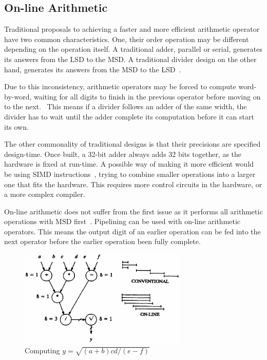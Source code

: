 \documentclass[journal]{IEEEtran}
\begin{document}
\subsection{On-line Arithmetic}
Traditional proposals to achieving a faster and more efficient arithmetic
operator have two common characteristics.
One, their order operation may be different depending on the operation itself.
A traditional adder, parallel or serial, generates its answers from the LSD to
the MSD.
A traditional divider design on the other hand, generates its answers from
the MSD to the LSD~\cite{Brent1}\cite{Srinivas1}.

Due to this inconsistency, arithmetic operators may be forced to compute
word-by-word, waiting for all digits to finish in the previous operator before
moving on to the next.~\cite{Zhao1}
This means if a divider follows an adder of the same width, the divider has to
wait until the adder complete its computation before it can start its own.

The other commonality of traditional designs is that their precisions are
specified design-time. Once built, a 32-bit adder always adds 32 bits together,
as the hardware is fixed at run-time.
A possible way of making it more efficient would be using SIMD
instructions~\cite{Duncan1}, trying to combine smaller operations into a larger
one that fits the hardware.
This requires more control circuits in the hardware, or a more complex compiler.

On-line arithmetic does not suffer from the first issue as it performs all
arithmetic operations with MSD first~\cite{Ercegovac1}.
Pipelining can be used with on-line arithmetic operators.
This means the output digit of an earlier operation can be fed into the next
operator before the earlier operation been fully complete.

\begin{figure}[H]
  \centering
  \includegraphics[width=8cm]{img/Online}
  \caption{Computing $y=\sqrt{(a+b)cd/(e-f)}$~\cite{Ercegovac1}}
  \label{Online}
\end{figure}
\end{document}
